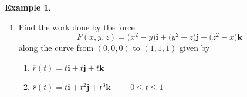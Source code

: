 \documentclass[11pt,a4paper]{article}
\theoremstyle{definition}
\newtheorem{exa}[thm]{Example}
\begin{document}
\begin{exa}
\begin{enumerate}
\item Find the work done by the force $$F(x,y,z) = \big(x^2 -y\big)\textbf{i} + \big(y^2 - z\big)\textbf{j} + \big(z^2-x\big)\textbf{k}$$ along the curve from $(0,0,0)$ to $(1,1,1)$ given by 
\begin{enumerate}
        \item $\overline{r}(t) = t\textbf{i} + t \textbf{j} + t\textbf{k}$

        \item $\overline{r}(t) = t\textbf{i} + t^2\textbf{j} + t^3\textbf{k}\hspace{1cm} 0\leq t \leq 1$
\end{enumerate}
\end{enumerate}
\end{exa}
\end{document}

